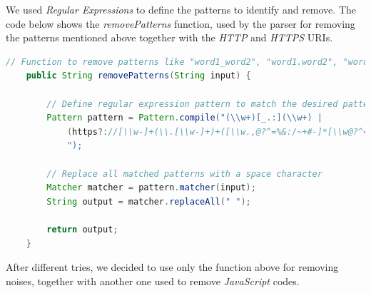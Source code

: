 We used \textit{Regular Expressions} to define the patterns to identify and remove. The code below shows the \textit{removePatterns} function, used by the parser for removing the patterns mentioned above together with the \textit{HTTP} and \textit{HTTPS} URIs.
\begin{lstlisting}[language=Java]
    // Function to remove patterns like "word1_word2", "word1.word2", "word1.word2", and HTTP/HTTPS URIs from a string
    public String removePatterns(String input) {

        // Define regular expression pattern to match the desired patterns
        Pattern pattern = Pattern.compile("(\\w+)[_.:](\\w+) |
            (https?://[\\w-]+(\\.[\\w-]+)+([\\w.,@?^=%&:/~+#-]*[\\w@?^=%&/~+#-])?)
            ");
            
        // Replace all matched patterns with a space character
        Matcher matcher = pattern.matcher(input);
        String output = matcher.replaceAll(" ");

        return output;
    }
\end{lstlisting}

After different tries, we decided to use only the function above for removing noises, together with another one used to remove \textit{JavaScript} codes.

